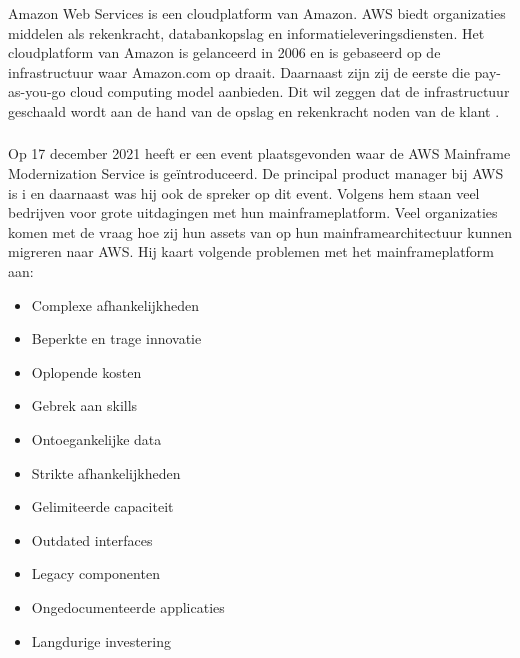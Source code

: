 Amazon Web Services is een cloudplatform van Amazon. AWS biedt organizaties middelen als rekenkracht, databankopslag en informatieleveringsdiensten. Het cloudplatform van Amazon is gelanceerd in 2006 en is gebaseerd op de infrastructuur waar Amazon.com op draait. Daarnaast zijn zij de eerste die pay-as-you-go cloud computing model aanbieden. Dit wil zeggen dat de infrastructuur geschaald wordt aan de hand van de opslag en rekenkracht noden van de klant \autocite{Gillis2020}.

\subsubsection{}
\label{sec:AWS Mainframe Modernization Service }

Op 17 december 2021 heeft er een event plaatsgevonden waar de AWS Mainframe Modernization Service is geïntroduceerd. De principal product manager bij AWS is \citeauthor{Valence2021} i en daarnaast was hij ook de spreker op dit event. Volgens hem staan veel bedrijven voor grote uitdagingen met hun mainframeplatform. Veel organizaties komen met de vraag hoe zij hun assets van op hun mainframearchitectuur kunnen migreren naar AWS. Hij kaart volgende problemen met het mainframeplatform aan: 
 \begin{itemize}
    \item Complexe afhankelijkheden
    \item Beperkte en trage innovatie
    \item Oplopende kosten
    \item Gebrek aan skills
    \item Ontoegankelijke data
    \item Strikte afhankelijkheden
    \item Gelimiteerde capaciteit
    \item Outdated interfaces 
    \item Legacy componenten
    \item Ongedocumenteerde applicaties 
    \item Langdurige investering 
\end{itemize}


